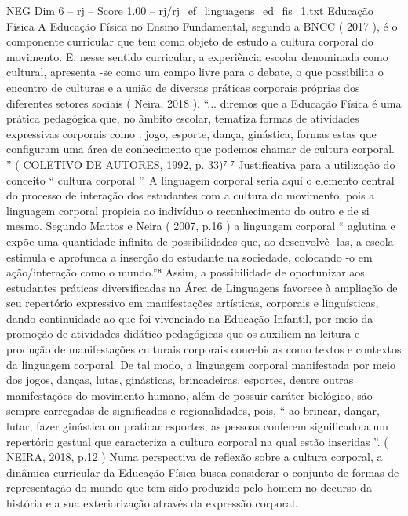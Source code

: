 \begin{textsample}{NEG Dim 6 – rj – Score 1.00 – rj/rj\_ef\_linguagens\_ed\_fis\_1.txt}  \label{ex:f6_neg_020}
Educação Física A Educação Física no Ensino Fundamental, segundo a BNCC ( 2017 ), é o componente curricular que tem como objeto de estudo a cultura corporal do movimento.
E, nesse sentido curricular, a experiência escolar denominada como cultural, apresenta -se como um campo livre para o debate, o que possibilita o encontro de culturas e a união de diversas práticas corporais próprias dos diferentes setores sociais ( Neira, 2018 ). “... diremos que a Educação Física é uma prática pedagógica que, no âmbito escolar, tematiza formas de atividades expressivas corporais como : jogo, esporte, dança, ginástica, formas estas que configuram uma área de conhecimento que podemos chamar de cultura corporal. ” ( COLETIVO DE AUTORES, 1992, p. 33)⁷ ⁷ Justificativa para a utilização do conceito “ cultura corporal ”.
A linguagem corporal seria aqui o elemento central do processo de interação dos estudantes com a cultura do movimento, pois a linguagem corporal propicia ao indivíduo o reconhecimento do outro e de si mesmo.
Segundo Mattos e Neira ( 2007, p.16 ) a linguagem corporal “ aglutina e expõe uma quantidade infinita de possibilidades que, ao desenvolvê -las, a escola estimula e aprofunda a inserção do estudante na sociedade, colocando -o em ação/interação como o mundo.”⁸ Assim, a possibilidade de oportunizar aos estudantes práticas diversificadas na Área de Linguagens favorece à ampliação de seu repertório expressivo em manifestações artísticas, corporais e linguísticas, dando continuidade ao que foi vivenciado na Educação Infantil, por meio da promoção de atividades didático-pedagógicas que os auxiliem na leitura e produção de manifestações culturais corporais concebidas como textos e contextos da linguagem corporal.
De tal modo, a linguagem corporal manifestada por meio dos jogos, danças, lutas, ginásticas, brincadeiras, esportes, dentre outras manifestações do movimento humano, além de possuir caráter biológico, são sempre carregadas de significados e regionalidades, pois, “ ao brincar, dançar, lutar, fazer ginástica ou praticar esportes, as pessoas conferem significado a um repertório gestual que caracteriza a cultura corporal na qual estão inseridas ”. ( NEIRA, 2018, p.12 ) Numa perspectiva de reflexão sobre a cultura corporal, a dinâmica curricular da Educação Física busca considerar o conjunto de formas de representação do mundo que tem sido produzido pelo homem no decurso da história e a sua exteriorização através da expressão corporal.

\end{textsample}
